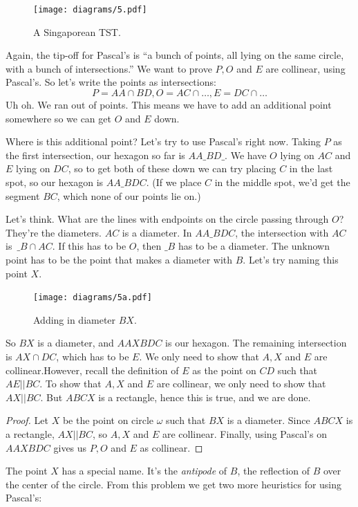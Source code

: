 \documentclass[11pt,paper=letter]{scrartcl}
\begin{document}
\begin{figure}
\centering
    \texttt{[image: diagrams/5.pdf]}
\caption{A Singaporean TST.}
\end{figure}

Again, the tip-off for Pascal's is ``a bunch of points, all lying on the same circle, with a bunch of intersections.'' We want to prove $P, O$ and $E$ are collinear, using Pascal's. So let's write the points as intersections: $$P = AA \cap BD, O = AC \cap \ldots, E = DC \cap \ldots$$ Uh oh. We ran out of points. This means we have to add an additional point somewhere so we can get $O$ and $E$ down.

Where is this additional point? Let's try to use Pascal's right now. Taking $P$ as the first intersection, our hexagon so far is $AA\_BD\_$. We have $O$ lying on $AC$ and $E$ lying on $DC$, so to get both of these down we can try placing $C$ in the last spot, so our hexagon is $AA\_BDC$. (If we place $C$ in the middle spot, we'd get the segment $BC$, which none of our points lie on.)

Let's think. What are the lines with endpoints on the circle passing through $O$? They're the diameters. $AC$ is a diameter. In $AA\_BDC$, the intersection with $AC$ is~$\_B \cap AC$. If this has to be $O$, then $\_B$ has to be a diameter. The unknown point has to be the point that makes a diameter with $B$. Let's try naming this point $X$.

\begin{figure}
\centering
    \texttt{[image: diagrams/5a.pdf]}
\caption{Adding in diameter $BX$.}
\end{figure}

So $BX$ is a diameter, and $AAXBDC$ is our hexagon. The remaining intersection is $AX \cap DC$, which has to be $E$. We only need to show that $A, X$ and $E$ are collinear.However, recall the definition of $E$ as the point on $CD$ such that $AE||BC$. To show that $A, X$ and $E$ are collinear, we only need to show that $AX||BC$. But $ABCX$ is a rectangle, hence this is true, and we are done.

\begin{proof}
  Let $X$ be the point on circle $\omega$ such that $BX$ is a diameter. Since $ABCX$ is a rectangle, $AX||BC$, so $A, X$ and $E$ are collinear. Finally, using Pascal's on $AAXBDC$ gives us $P, O$ and $E$ as collinear.
\end{proof}

The point $X$ has a special name. It's the \emph{antipode} of $B$, the reflection of $B$ over the center of the circle. From this problem we get two more heuristics for using Pascal's:
\end{document}
